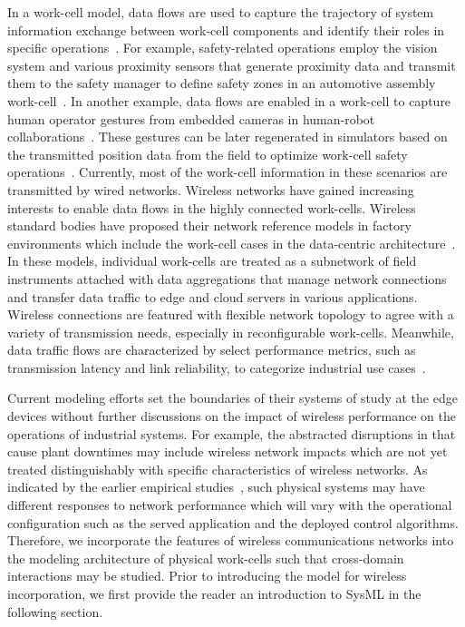 In a work-cell model, data flows are used to capture the trajectory of system information exchange between work-cell components and identify their roles in specific operations~\cite{OpenArch}. For example, safety-related operations employ the vision system and various proximity sensors that generate proximity data and transmit them to the safety manager to define safety zones in an automotive assembly work-cell~\cite{safeeye}. 
In another example, data flows are enabled in a work-cell to capture human operator gestures from embedded cameras in human-robot collaborations~\cite{cobotcell}. These gestures can be later regenerated in simulators based on the transmitted position data from the field to optimize work-cell safety operations~\cite{gesture}. Currently, most of the work-cell information in these scenarios are transmitted by wired networks. Wireless networks have gained increasing interests to enable data flows in the highly connected work-cells. Wireless standard bodies have proposed their network reference models in factory environments which include the work-cell cases in the data-centric architecture~\cite{ETSI889, KPItable}. In these models, individual work-cells are treated as a subnetwork of field instruments attached with data aggregations that manage network connections and transfer data traffic to edge and cloud servers in various applications. Wireless connections are featured with flexible network topology to agree with a variety of transmission needs, especially in reconfigurable work-cells. Meanwhile, data traffic flows are characterized by select performance metrics, such as transmission latency and link reliability, to categorize industrial use cases~\cite{KPItable}. 

Current modeling efforts set the boundaries of their systems of study at the edge devices without further discussions on the impact of wireless performance on the operations of industrial systems. For example, the abstracted disruptions in \cite{QChang,Liu2012} that cause plant downtimes may include wireless network impacts which are not yet treated distinguishably with specific characteristics of wireless networks. As indicated by the earlier empirical studies~\cite{Liu2016}, such physical systems may have different responses to network performance which will vary with the operational configuration such as the served application and the deployed control algorithms. Therefore, we incorporate the features of wireless communications networks into the modeling architecture of physical work-cells such that cross-domain interactions may be studied.  Prior to introducing the model for wireless incorporation, we first provide the reader an introduction to SysML in the following section.

